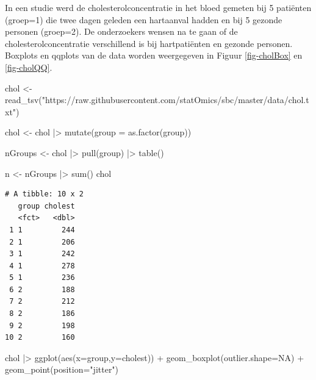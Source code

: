 \documentclass[
  dutch,
  letterpaper,
  12pt]{book}
\newenvironment{Shaded}{\begin{snugshade}}{\end{snugshade}}
\newcommand{\AttributeTok}[1]{\textcolor[rgb]{0.40,0.45,0.13}{#1}}
\newcommand{\ConstantTok}[1]{\textcolor[rgb]{0.56,0.35,0.01}{#1}}
\newcommand{\FunctionTok}[1]{\textcolor[rgb]{0.28,0.35,0.67}{#1}}
\newcommand{\NormalTok}[1]{\textcolor[rgb]{0.00,0.23,0.31}{#1}}
\newcommand{\OtherTok}[1]{\textcolor[rgb]{0.00,0.23,0.31}{#1}}
\newcommand{\SpecialCharTok}[1]{\textcolor[rgb]{0.37,0.37,0.37}{#1}}
\newcommand{\StringTok}[1]{\textcolor[rgb]{0.13,0.47,0.30}{#1}}
\theoremstyle{definition}
\theoremstyle{definition}
\theoremstyle{definition}
\theoremstyle{remark}
\begin{document}
In een studie werd de cholesterolconcentratie in het bloed gemeten bij 5
patiënten (groep=1) die twee dagen geleden een hartaanval hadden en bij
5 gezonde personen (groep=2). De onderzoekers wensen na te gaan of de
cholesterolconcentratie verschillend is bij hartpatiënten en gezonde
personen. Boxplots en qqplots van de data worden weergegeven in Figuur
\ref{fig-cholBox} en \ref{fig-cholQQ}.

\begin{Shaded}
\begin{Highlighting}[]
\NormalTok{chol }\OtherTok{\textless{}{-}} \FunctionTok{read\_tsv}\NormalTok{(}\StringTok{"https://raw.githubusercontent.com/statOmics/sbc/master/data/chol.txt"}\NormalTok{)}

\NormalTok{chol }\OtherTok{\textless{}{-}}\NormalTok{ chol }\SpecialCharTok{|\textgreater{}}
  \FunctionTok{mutate}\NormalTok{(}\AttributeTok{group =} \FunctionTok{as.factor}\NormalTok{(group))}

\NormalTok{nGroups }\OtherTok{\textless{}{-}}\NormalTok{ chol }\SpecialCharTok{|\textgreater{}}
  \FunctionTok{pull}\NormalTok{(group) }\SpecialCharTok{|\textgreater{}}
  \FunctionTok{table}\NormalTok{()}

\NormalTok{n }\OtherTok{\textless{}{-}}\NormalTok{ nGroups }\SpecialCharTok{|\textgreater{}}
  \FunctionTok{sum}\NormalTok{()}
\NormalTok{chol}
\end{Highlighting}
\end{Shaded}

\begin{verbatim}
# A tibble: 10 x 2
   group cholest
   <fct>   <dbl>
 1 1         244
 2 1         206
 3 1         242
 4 1         278
 5 1         236
 6 2         188
 7 2         212
 8 2         186
 9 2         198
10 2         160
\end{verbatim}

\begin{Shaded}
\begin{Highlighting}[]
\NormalTok{chol }\SpecialCharTok{|\textgreater{}}  
  \FunctionTok{ggplot}\NormalTok{(}\FunctionTok{aes}\NormalTok{(}\AttributeTok{x=}\NormalTok{group,}\AttributeTok{y=}\NormalTok{cholest)) }\SpecialCharTok{+}
  \FunctionTok{geom\_boxplot}\NormalTok{(}\AttributeTok{outlier.shape=}\ConstantTok{NA}\NormalTok{) }\SpecialCharTok{+}
  \FunctionTok{geom\_point}\NormalTok{(}\AttributeTok{position=}\StringTok{"jitter"}\NormalTok{)}
\end{Highlighting}
\end{Shaded}
\end{document}
